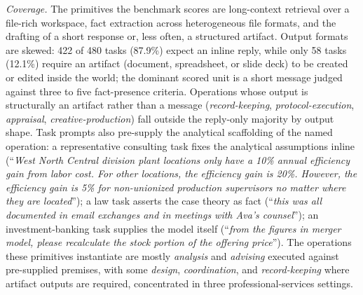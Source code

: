 \documentclass{article}
\begin{document}
\textit{Coverage.}
The primitives the benchmark scores are long-context retrieval over a file-rich workspace, fact extraction across heterogeneous file formats, and the drafting of a short response or, less often, a structured artifact.
Output formats are skewed: 422 of 480 tasks (87.9\%) expect an inline reply, while only 58 tasks (12.1\%) require an artifact (document, spreadsheet, or slide deck) to be created or edited inside the world; the dominant scored unit is a short message judged against three to five fact-presence criteria.
Operations whose output is structurally an artifact rather than a message (\emph{record-keeping}, \emph{protocol-execution}, \emph{appraisal}, \emph{creative-production}) fall outside the reply-only majority by output shape.
Task prompts also pre-supply the analytical scaffolding of the named operation: a representative consulting task fixes the analytical assumptions inline (``\emph{West North Central division plant locations only have a 10\% annual efficiency gain from labor cost. For other locations, the efficiency gain is 20\%. However, the efficiency gain is 5\% for non-unionized production supervisors no matter where they are located}''); a law task asserts the case theory as fact (``\emph{this was all documented in email exchanges and in meetings with Ava's counsel}''); an investment-banking task supplies the model itself (``\emph{from the figures in merger model, please recalculate the stock portion of the offering price}'').
The operations these primitives instantiate are mostly \emph{analysis} and \emph{advising} executed against pre-supplied premises, with some \emph{design}, \emph{coordination}, and \emph{record-keeping} where artifact outputs are required, concentrated in three professional-services settings.
\end{document}

